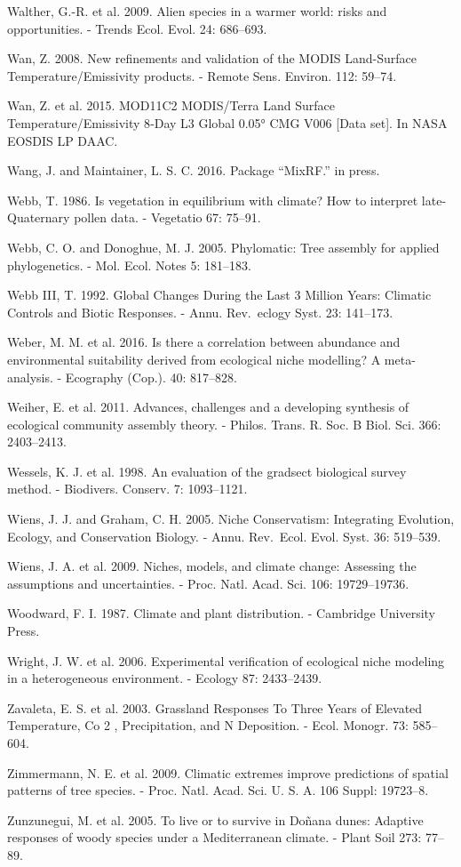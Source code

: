 \documentclass[11pt,twoside]{reedthesis}
\begin{document}
Walther, G.-R. et al. 2009. Alien species in a warmer world: risks and
opportunities. - Trends Ecol. Evol. 24: 686--693.\par
Wan, Z. 2008. New refinements and validation of the MODIS Land-Surface
Temperature/Emissivity products. - Remote Sens. Environ. 112:
59--74.\par
Wan, Z. et al. 2015. MOD11C2 MODIS/Terra Land Surface
Temperature/Emissivity 8‐Day L3 Global 0.05° CMG V006 {[}Data set{]}. In
NASA EOSDIS LP DAAC.\par
Wang, J. and Maintainer, L. S. C. 2016. Package ``MixRF.'' in press.\par
Webb, T. 1986. Is vegetation in equilibrium with climate? How to
interpret late-Quaternary pollen data. - Vegetatio 67: 75--91.\par
Webb, C. O. and Donoghue, M. J. 2005. Phylomatic: Tree assembly for
applied phylogenetics. - Mol. Ecol. Notes 5: 181--183.\par
Webb III, T. 1992. Global Changes During the Last 3 Million Years:
Climatic Controls and Biotic Responses. - Annu. Rev.~eclogy Syst. 23:
141--173.\par
Weber, M. M. et al. 2016. Is there a correlation between abundance and
environmental suitability derived from ecological niche modelling? A
meta-analysis. - Ecography (Cop.). 40: 817--828.\par
Weiher, E. et al. 2011. Advances, challenges and a developing synthesis
of ecological community assembly theory. - Philos. Trans. R. Soc. B
Biol. Sci. 366: 2403--2413.\par
Wessels, K. J. et al. 1998. An evaluation of the gradsect biological
survey method. - Biodivers. Conserv. 7: 1093--1121.\par
Wiens, J. J. and Graham, C. H. 2005. Niche Conservatism: Integrating
Evolution, Ecology, and Conservation Biology. - Annu. Rev.~Ecol. Evol.
Syst. 36: 519--539.\par
Wiens, J. A. et al. 2009. Niches, models, and climate change: Assessing
the assumptions and uncertainties. - Proc. Natl. Acad. Sci. 106:
19729--19736.\par
Woodward, F. I. 1987. Climate and plant distribution. - Cambridge
University Press.\par
Wright, J. W. et al. 2006. Experimental verification of ecological niche
modeling in a heterogeneous environment. - Ecology 87: 2433--2439.\par
Zavaleta, E. S. et al. 2003. Grassland Responses To Three Years of
Elevated Temperature, Co 2 , Precipitation, and N Deposition. - Ecol.
Monogr. 73: 585--604.\par
Zimmermann, N. E. et al. 2009. Climatic extremes improve predictions of
spatial patterns of tree species. - Proc. Natl. Acad. Sci. U. S. A. 106
Suppl: 19723--8.\par
Zunzunegui, M. et al. 2005. To live or to survive in Doñana dunes:
Adaptive responses of woody species under a Mediterranean climate. -
Plant Soil 273: 77--89.\par


\end{document}
